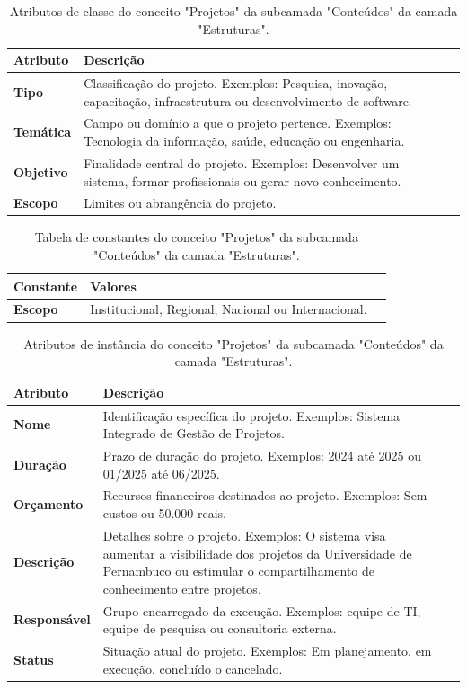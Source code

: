 \begin{apendicesenv}
\begin{table}[H]
\centering
\caption{Atributos de classe do conceito "Projetos" da subcamada "Conteúdos" da camada "Estruturas".}
\begin{tabularx}{\textwidth}{|l|X|X|}
\hline
\textbf{Atributo} & \textbf{Descrição} \\ \hline
\textbf{Tipo} & Classificação do projeto. Exemplos: Pesquisa, inovação, capacitação, infraestrutura ou desenvolvimento de software. \\ \hline
\textbf{Temática} & Campo ou domínio a que o projeto pertence. Exemplos: Tecnologia da informação, saúde, educação ou engenharia. \\ \hline
\textbf{Objetivo} & Finalidade central do projeto. Exemplos: Desenvolver um sistema, formar profissionais ou gerar novo conhecimento. \\ \hline
\textbf{Escopo} & Limites ou abrangência do projeto.\\ \hline
\end{tabularx}
\end{table}

\begin{table}[H]
\centering
\caption{Tabela de constantes do conceito "Projetos" da subcamada "Conteúdos" da camada "Estruturas".}
\begin{tabularx}{\textwidth}{|l|X|X|}
\hline
\textbf{Constante} & \textbf{Valores} \\ \hline
\textbf{Escopo} & Institucional, Regional, Nacional ou Internacional.\\ \hline
\end{tabularx}
\end{table}

\begin{table}[H]
\centering
\caption{Atributos de instância do conceito "Projetos" da subcamada "Conteúdos" da camada "Estruturas".}
\begin{tabularx}{\textwidth}{|l|X|X|}
\hline
\textbf{Atributo} & \textbf{Descrição} \\ \hline
\textbf{Nome} & Identificação específica do projeto. Exemplos: Sistema Integrado de Gestão de Projetos. \\ \hline
\textbf{Duração} & Prazo de duração do projeto. Exemplos: 2024 até 2025 ou 01/2025 até 06/2025. \\ \hline
\textbf{Orçamento} & Recursos financeiros destinados ao projeto. Exemplos: Sem custos ou 50.000 reais. \\ \hline
\textbf{Descrição} & Detalhes sobre o projeto. Exemplos: O sistema visa aumentar a visibilidade dos projetos da Universidade de Pernambuco ou estimular o compartilhamento de conhecimento entre projetos. \\ \hline
\textbf{Responsável} & Grupo encarregado da execução. Exemplos: equipe de TI, equipe de pesquisa ou consultoria externa. \\ \hline
\textbf{Status} & Situação atual do projeto. Exemplos: Em planejamento, em execução, concluído o cancelado. \\ \hline
\end{tabularx}
\end{table}


\end{apendicesenv}
